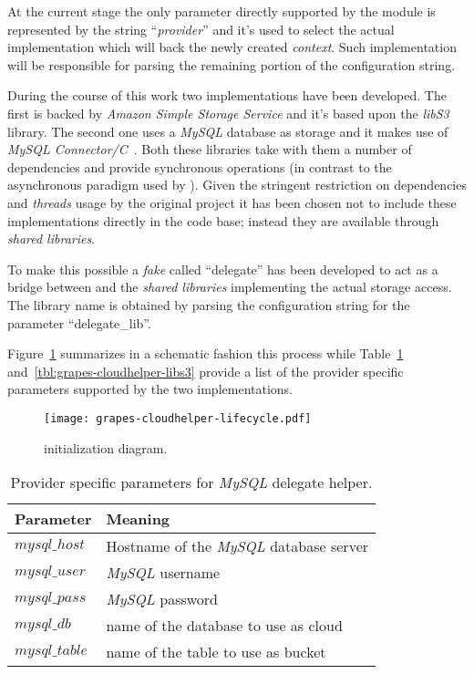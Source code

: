At the current stage the only parameter directly supported by the
\cloudhelper module is represented by the string ``\textit{provider}''
and it's used to select the actual implementation which will back the
newly created \textit{context}. Such implementation will be
responsible for parsing the remaining portion of the configuration
string.

During the course of this work two \cloudhelper implementations have been
developed. The first is backed by \textit{Amazon Simple Storage
  Service}  and it's based upon the \textit{libS3}~\cite{LibS3} library. The
second one uses a \textit{MySQL} database as storage and it
makes use of \textit{MySQL Connector/C}~\cite{MySQLConnectorC}. Both
these libraries take with them a number of dependencies and provide
synchronous operations (in contrast to the asynchronous paradigm used
by \grapes). Given the stringent restriction on dependencies and
\textit{threads} usage by the original project it has been chosen not to
include these \cloudhelper implementations directly in the code
base; instead they are available through \textit{shared libraries}.

To make this possible a \textit{fake} \cloudhelper called ``delegate''
has been developed to act as a bridge between \grapes and the \textit{shared
  libraries} implementing the actual \cloud storage access. The
library name is obtained by parsing the configuration string for the parameter
``delegate\_lib''.

Figure~\ref{fig:grapes-cloudhelper-lifecycle} summarizes in a schematic
fashion this process while Table~\ref{tbl:grapes-cloudhelper-mysql}
and~\ref{tbl:grapes-cloudhelper-libs3} provide a list of the provider
specific parameters supported by the two implementations.

\begin{figure}[H]
  \centering
  \texttt{[image: grapes-cloudhelper-lifecycle.pdf]}
  \caption{\cloudhelper initialization diagram.}
  \label{fig:grapes-cloudhelper-lifecycle}
\end{figure}

\begin{table}[H]
  \centering
  \begin{tabular}{|l|l|}
  \hline
  Parameter & Meaning \\
  \hline
  \hline
  $mysql\_host$ & Hostname of the \textit{MySQL} database server \\
  $mysql\_user$ & \textit{MySQL} username \\
  $mysql\_pass$ & \textit{MySQL} password \\
  $mysql\_db$ & name of the database to use as cloud \\
  $mysql\_table$ & name of the table to use as bucket \\
  \hline
  \end{tabular}
  \caption{Provider specific parameters for \textit{MySQL} delegate helper.}
  \label{tbl:grapes-cloudhelper-mysql}
\end{table}

